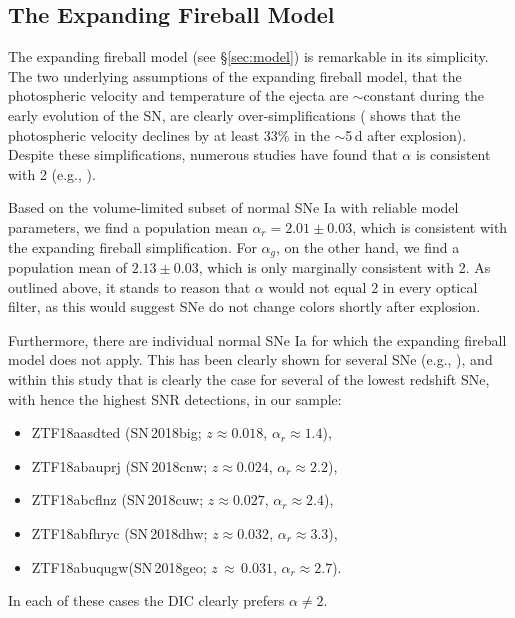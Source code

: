 \documentclass[twocolumn]{aastex63}
\begin{document}
\subsection{The Expanding Fireball Model}\label{sec:fireball_discussion}

The expanding fireball model (see \S\ref{sec:model}) is remarkable in its
simplicity. The two underlying assumptions of the expanding fireball model,
that the photospheric velocity and temperature of the ejecta are
$\sim$constant during the early evolution of the SN, are clearly
over-simplifications (\citealt{Parrent12} shows that the photospheric velocity
declines by at least 33\% in the $\sim$5\,d after explosion). Despite these
simplifications, numerous studies have found that $\alpha$ is consistent with
2 (e.g.,
\citealt{Conley06,Hayden10,Ganeshalingam11,Gonzalez-Gaitan12,Zheng17a}).

Based on the volume-limited subset of normal SNe Ia with reliable model
parameters, we find a population mean $\alpha_r = 2.01 \pm 0.03$, which is
consistent with the expanding fireball simplification. For $\alpha_g$, on the
other hand, we find a population mean of $2.13 \pm 0.03$, which is only
marginally consistent with 2. As outlined above, it stands to reason that
$\alpha$ would not equal 2 in every optical filter, as this would suggest SNe
do not change colors shortly after explosion.

Furthermore, there are individual normal SNe Ia for which the expanding
fireball model does not apply. This has been clearly shown for several SNe (e.g., \citealt{Zheng13,Zheng14,Goobar15,Miller18,Shappee19,Dimitriadis19}),
and within this study that is clearly the case for several of the lowest
redshift SNe, with hence the highest SNR detections, in our sample:
% 
\begin{itemize}
\item ZTF18aasdted (SN\,2018big; $z \approx 0.018$, $\alpha_r \approx 1.4$),
\item ZTF18abauprj (SN\,2018cnw; $z \approx 0.024$, $\alpha_r \approx 2.2$),
\item ZTF18abcflnz (SN\,2018cuw; $z \approx 0.027$, $\alpha_r \approx 2.4$),
\item ZTF18abfhryc (SN\,2018dhw; $z \approx 0.032$, $\alpha_r \approx 3.3$), 
\item ZTF18abuqugw\;(SN\,2018geo; $z\,\approx\,0.031$, $\alpha_r\approx2.7$).
\end{itemize}
% 
 In each of these cases the DIC clearly prefers $\alpha \neq 2$.
\end{document}
